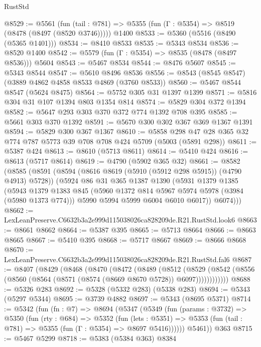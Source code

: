 \begin{lexlean}{RustStd}
\begin{coremodule}
@8529 := @5561
    (fun (tail : @781) => @5355 (fun (Γ : @5354) => @8519 (@8478 (@8497 (@8520 @3746)))))
    @1400
@8533 := @5360 (@5516 (@8490 (@5365 @1401)))
@8534 := @8410 @8533
@8535 := @5343 @8534
@8536 := @8520 @1400
@8542 := @5579 (fun (Γ : @5354) => @8535 (@8478 (@8497 @8536))) @5604
@8543 := @5467 @8534
@8544 := @8476 @5607
@8545 := @5343 @8544
@8547 := @5610 @8496 @8536
@8556 := @8543 (@8545 @8547) (@3889 @4862 @4858 @8533 @4869 (@3760 @8533))
@8560 := @5467 @8544 @8547 (@5624 @8475)
@8564 := @5752 @305 @31 @1397 @1399
@8571 := @5816 @304 @31 @107 @1394 @803 @1354 @814
@8574 := @5829 @304 @372 @1394
@8582 := @5647 @293 @303 @370 @372 @774 @1392 @708 @395
@8585 := @5661 @303 @370 @1392
@8591 := @5670 @300 @302 @367 @369 @1367 @1391
@8594 := @5829 @300 @367 @1367
@8610 := @5858 @298 @47 @28 @365 @32 @774 @787 @5773 @39 @708 @708 @424 @5709 (@5003 (@5891 @298))
@8611 := @5387 @424
@8613 := @8610 (@5713 @8611)
@8614 := @5410 @424
@8616 := @8613 (@5717 @8614)
@8619 := @4790 (@5902 @365 @32)
@8661 := @8582
    (@8585
      (@8591
        (@8594 (@8616 @8619 (@5910 (@5912 @298 @5915)) (@4790 @4913) @5728))
        (@5924
          @86
          @31
          @365
          @1387
          @1390
          (@5931
            @1379
            @1385
            (@5943
              @1379
              @1383
              @845
              (@5960 @1372 @814 @5967 @5974 @5978 (@3984 (@5980 @1373 @774)))
              @5990
              @5994
              @5999
              @6004
              @6010
              @6017))
          @6074)))
@8662 := LexLeanPreserve.C6632b3a2e999d115038026ca828209de.R21.RustStd.look6
@8663 := @8661 @8662
@8664 := @5387 @395
@8665 := @5713 @8664
@8666 := @8663 @8665
@8667 := @5410 @395
@8668 := @5717 @8667
@8669 := @8666 @8668
@8670 := LexLeanPreserve.C6632b3a2e999d115038026ca828209de.R21.RustStd.fal6
@8687 := @8407
    (@8429
      (@8468
        (@8470
          (@8472
            (@8489
              (@8512
                (@8529
                  (@8542 (@8556 (@8560 (@8564 (@8571 (@8574 (@8669 @8670 @5728)) @6097))))))))))))
@8688 := @5326 @283
@8692 := @5328 (@5332 @283) (@5338 @283)
@8694 := @5343 (@5297 @5344)
@8695 := @3739 @4882
@8697 := @5343 (@8695 @5371)
@8714 := @5342
    (fun (fn : @7) =>
    @8694
      (@5347
        (@5349
          (fun (params : @3732) =>
          @5350
            (fun (rty : @684) =>
            @5352
              (fun (lets : @5351) =>
              @5353 (fun (tail : @781) => @5355 (fun (Γ : @5354) => @8697 @5416))))))
        @5461))
    @363
@8715 := @5467 @5299
@8718 := @5383 (@5384 @363) @8384

\end{coremodule}
\end{lexlean}
